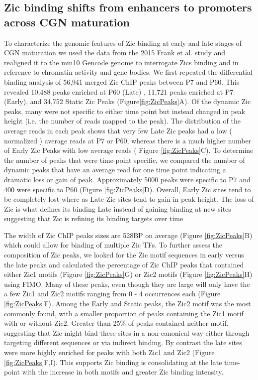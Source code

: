 \documentclass[fleqn,10pt]{wlscirep}
\begin{document}
\subsection*{Zic binding shifts from enhancers to promoters across CGN maturation} 

To characterize the genomic features of Zic binding at early and late stages of CGN maturation we used the data from the 2015 Frank et al. study \cite{Frank2015RegulationCerebellum} and realigned it to the mm10 Gencode genome to interrogate Zics binding and in reference to chromatin activity and gene bodies. We first repeated the differential binding analysis of 56,941 merged Zic ChIP peaks between P7 and P60. This revealed  10,488 peaks enriched at P60 (Late) , 11,721 peaks enriched at P7 (Early), and 34,752  Static Zic Peaks (Figure\ref{fig:ZicPeaks}A).  Of the dynamic Zic peaks, many were not specific to either time point but instead changed in peak height (i.e. the number of reads mapped to the peak). The distribution of the average reads in each peak shows  that very few Late Zic peaks had a low ( normalized ) average reads at P7 or P60, whereas there is a much higher number of Early Zic Peaks with low average reads ( Figure \ref{fig:ZicPeaks}C). To determine the number of peaks that were time-point specific, we compared the number of dynamic peaks that have an average read  for one time point  indicating a dramatic loss or gain of peak. Approximately 5000 peaks were specific to P7 and 400 were specific to P60 (Figure \ref{fig:ZicPeaks}D). Overall, Early Zic sites tend to be completely lost where as Late Zic sites tend to gain in peak height. The loss of Zic is what defines its binding Late instead of gaining binding at new sites suggesting that Zic is refining its binding targets over time

The width of Zic ChIP peaks sizes are 528BP on average (Figure \ref{fig:ZicPeaks}B) which could allow for binding of multiple Zic TFs. To further assess the composition of Zic peaks, we looked for the Zic motif sequences in early versus the late peaks and calculated the percentage of Zic ChIP peaks that contained either Zic1 motifs (Figure \ref{fig:ZicPeaks}G) or Zic2 motifs (Figure \ref{fig:ZicPeaks}H) using FIMO.  
Many of these peaks, even though they are large will only have the a few Zic1 and Zic2 motifs ranging from 0 - 4 occurrences each (Figure \ref{fig:ZicPeaks}F). Among the Early and Static peaks, the Zic2 motif was the most commonly found, with a smaller proportion of peaks containing the Zic1 motif with or without Zic2. Greater than 25\% of peaks contained neither motif, suggesting that Zic might bind these sites in a non-canonical way either through targeting different sequences or via indirect binding. By contrast the late sites were more highly enriched for peaks with both Zic1 and Zic2 (Figure \ref{fig:ZicPeaks}F,I). This supports Zic binding is consolidating at the late time-point with the increase in both motifs and greater Zic binding intensity.
\end{document}
